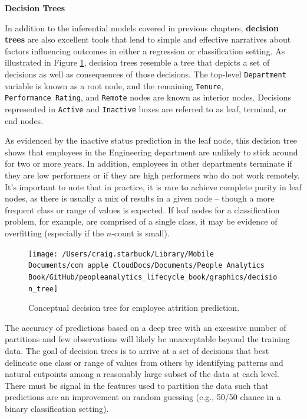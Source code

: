 \documentclass[
]{book}
\begin{document}
\textbf{Decision Trees}

In addition to the inferential models covered in previous chapters, \textbf{decision trees} are also excellent tools that lend to simple and effective narratives about factors influencing outcomes in either a regression or classification setting. As illustrated in Figure \ref{fig:decision-tree}, decision trees resemble a tree that depicts a set of decisions as well as consequences of those decisions. The top-level \texttt{Department} variable is known as a root node, and the remaining \texttt{Tenure}, \texttt{Performance\ Rating}, and \texttt{Remote} nodes are known as interior nodes. Decisions represented in \texttt{Active} and \texttt{Inactive} boxes are referred to as leaf, terminal, or end nodes.

As evidenced by the inactive status prediction in the leaf node, this decision tree shows that employees in the Engineering department are unlikely to stick around for two or more years. In addition, employees in other departments terminate if they are low performers or if they are high performers who do not work remotely. It's important to note that in practice, it is rare to achieve complete purity in leaf nodes, as there is usually a mix of results in a given node -- though a more frequent class or range of values is expected. If leaf nodes for a classification problem, for example, are comprised of a single class, it may be evidence of overfitting (especially if the \(n\)-count is small).

\begin{figure}

{\centering \texttt{[image: /Users/craig.starbuck/Library/Mobile Documents/com~apple~CloudDocs/Documents/People Analytics Book/GitHub/peopleanalytics\_lifecycle\_book/graphics/decision\_tree]} 

}

\caption{Conceptual decision tree for employee attrition prediction.}\label{fig:decision-tree}
\end{figure}

The accuracy of predictions based on a deep tree with an excessive number of partitions and few observations will likely be unacceptable beyond the training data. The goal of decision trees is to arrive at a set of decisions that best delineate one class or range of values from others by identifying patterns and natural cutpoints among a reasonably large subset of the data at each level. There must be signal in the features used to partition the data such that predictions are an improvement on random guessing (e.g., 50/50 chance in a binary classification setting).
\end{document}
